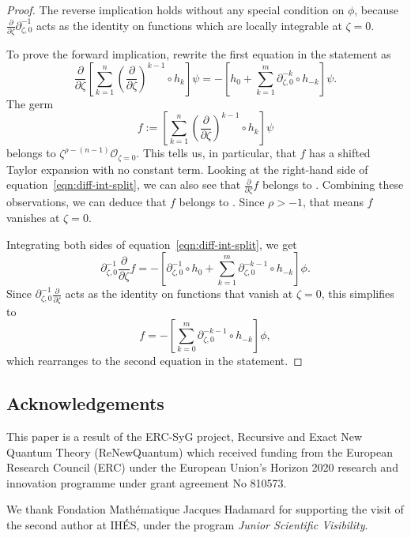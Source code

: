 \documentclass[pdftex]{sigma}
\newcommand{\fracderiv}[3]{\partial^{#1}_{#2, #3}}
\numberwithin{equation}{section}
\begin{document}
\begin{proof}
The reverse implication holds without any special condition on $\phi$, because $\frac{\partial}{\partial \zeta} \fracderiv{-1}{\zeta}{0}$ acts as the identity on functions which are locally integrable at $\zeta = 0$.

To prove the forward implication, rewrite the first equation in the statement as
\begin{equation}\label{eqn:diff-int-split}
\frac{\partial}{\partial \zeta} \left[ \sum_{k = 1}^n \left(\frac{\partial}{\partial \zeta}\right)^{k-1} \circ h_k \right] \psi = -\left[ h_0 + \sum_{k = 1}^m \fracderiv{-k}{\zeta}{0} \circ h_{-k} \right] \psi.
\end{equation}
The germ
\[ f := \left[ \sum_{k = 1}^n \left(\frac{\partial}{\partial \zeta}\right)^{k-1} \circ h_k \right] \psi \]
belongs to $\zeta^{\rho-(n-1)} \mathcal{O}_{\zeta = 0}$. This tells us, in particular, that $f$ has a shifted Taylor expansion with no constant term. Looking at the right-hand side of equation~\eqref{eqn:diff-int-split}, we can also see that $\frac{\partial}{\partial \zeta} f$ belongs to . Combining these observations, we can deduce that $f$ belongs to . Since $\rho > -1$, that means $f$ vanishes at $\zeta = 0$.

Integrating both sides of equation~\eqref{eqn:diff-int-split}, we get
\[ \fracderiv{-1}{\zeta}{0} \frac{\partial}{\partial \zeta} f = -\left[ \fracderiv{-1}{\zeta}{0} \circ h_0 + \sum_{k = 1}^m \fracderiv{-k-1}{\zeta}{0} \circ h_{-k} \right] \phi. \]
Since $\fracderiv{-1}{\zeta}{0} \frac{\partial}{\partial \zeta}$ acts as the identity on functions that vanish at $\zeta = 0$, this simplifies to
\[ f = -\left[ \sum_{k = 0}^m \fracderiv{-k-1}{\zeta}{0} \circ h_{-k} \right] \phi, \]
which rearranges to the second equation in the statement.
\end{proof}

\subsection*{Acknowledgements}
This paper is a result of the ERC-SyG project, Recursive and Exact New Quantum Theory (ReNewQuantum) which received funding from the European Research Council (ERC) under the European Union's Horizon 2020 research and innovation programme under grant agreement No 810573.

We thank Fondation Math\'ematique Jacques Hadamard for supporting the visit of the second author at IH\'{E}S, under the program \textit{Junior Scientific Visibility}.
\end{document}
